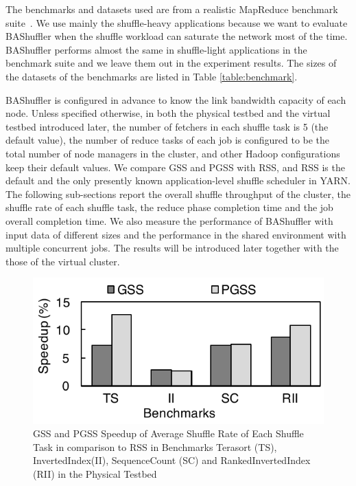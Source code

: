 \documentclass[10pt,journal,compsoc]{IEEEtran}
\begin{document}
The benchmarks and datasets used are from a realistic MapReduce benchmark suite~\cite{ahmad2012puma}. 
We use mainly the shuffle-heavy applications because we want to evaluate  BAShuffler when the shuffle workload can saturate the
network most of the time. 
BAShuffler performs almost the same in shuffle-light applications in the benchmark suite and we leave them out in the experiment results. 
The sizes of the datasets of the benchmarks are listed in Table \ref{table:benchmark}.

BAShuffler is configured in advance to know
the link bandwidth capacity of each node.
Unless specified otherwise, %
in both the physical testbed and the virtual testbed introduced later, 
the number of fetchers in each shuffle task is 5 (the default value), 
the number of reduce tasks of each job is configured to
be the total number of node managers in the cluster, 
and other Hadoop configurations keep their default values. 
We compare GSS and PGSS with RSS, and RSS is the default and the only
presently known application-level shuffle scheduler in YARN. 
The following sub-sections report the overall shuffle throughput of
the cluster, the shuffle rate of each shuffle task, the reduce phase
completion time and the job overall completion time.
We also measure the performance of BAShuffler with input data of
different sizes
and the performance in the shared environment with multiple concurrent jobs. 
The results will be introduced later together with the those of the virtual cluster. 

\begin{figure}
\centering
\includegraphics[width=0.7\columnwidth,height=0.35\columnwidth]{figure6}
\caption{GSS and PGSS Speedup of Average Shuffle Rate of Each Shuffle Task in comparison to RSS in Benchmarks Terasort (TS), InvertedIndex(II), SequenceCount (SC) and RankedInvertedIndex (RII) in the Physical Testbed} 
\label{fig:new_shuffle_rate}
\end{figure}
\end{document}
